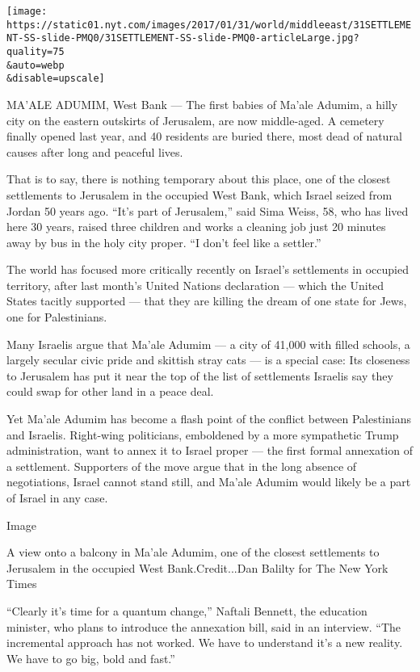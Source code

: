 \texttt{[image: https://static01.nyt.com/images/2017/01/31/world/middleeast/31SETTLEMENT-SS-slide-PMQ0/31SETTLEMENT-SS-slide-PMQ0-articleLarge.jpg?quality=75\\\&auto=webp\\\&disable=upscale]}

MA'ALE ADUMIM, West Bank --- The first babies of Ma'ale Adumim, a hilly
city on the eastern outskirts of Jerusalem, are now middle-aged. A
cemetery finally opened last year, and 40 residents are buried there,
most dead of natural causes after long and peaceful lives.

That is to say, there is nothing temporary about this place, one of the
closest settlements to Jerusalem in the occupied West Bank, which Israel
seized from Jordan 50 years ago. ``It's part of Jerusalem,'' said Sima
Weiss, 58, who has lived here 30 years, raised three children and works
a cleaning job just 20 minutes away by bus in the holy city proper. ``I
don't feel like a settler.''

The world has focused more critically recently on Israel's settlements
in occupied territory, after last month's United Nations declaration ---
which the United States tacitly supported --- that they are killing the
dream of one state for Jews, one for Palestinians.

Many Israelis argue that Ma'ale Adumim --- a city of 41,000 with filled
schools, a largely secular civic pride and skittish stray cats --- is a
special case: Its closeness to Jerusalem has put it near the top of the
list of settlements Israelis say they could swap for other land in a
peace deal.

Yet Ma'ale Adumim has become a flash point of the conflict between
Palestinians and Israelis. Right-wing politicians, emboldened by a more
sympathetic Trump administration, want to annex it to Israel proper ---
the first formal annexation of a settlement. Supporters of the move
argue that in the long absence of negotiations, Israel cannot stand
still, and Ma'ale Adumim would likely be a part of Israel in any case.

Image

A view onto a balcony in Ma'ale Adumim, one of the closest settlements
to Jerusalem in the occupied West Bank.Credit...Dan Balilty for The New
York Times

``Clearly it's time for a quantum change,'' Naftali Bennett, the
education minister, who plans to introduce the annexation bill, said in
an interview. ``The incremental approach has not worked. We have to
understand it's a new reality. We have to go big, bold and fast.''

